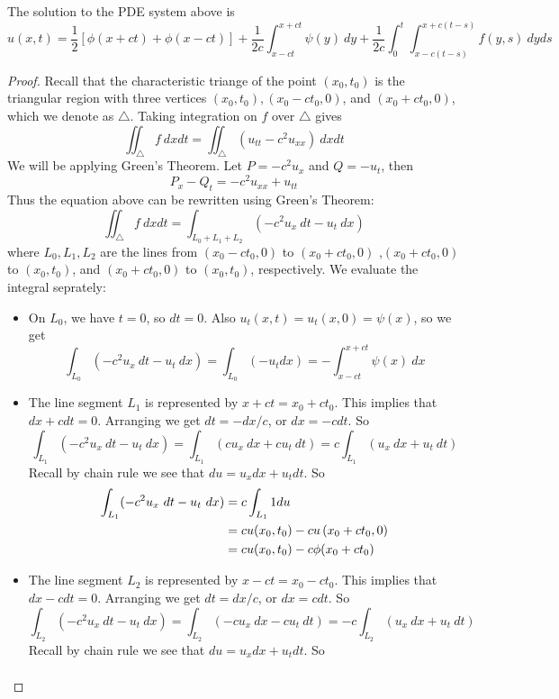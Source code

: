 \begin{thm}
    The solution to the PDE system above is 
    \[u(x,t) = \frac{1}{2}[\phi(x+ct) + \phi(x-ct)] + \frac{1}{2c}\int_{x-ct}^{x+ct}\psi(y)\ dy + \frac{1}{2c}\int_{0}^{t}\int^{x+c(t-s)}_{x-c(t-s)} f(y,s)\ dyds\]
\end{thm}
\begin{proof}
    Recall that the characteristic triange of the point $(x_0,t_0)$ is the triangular region with three vertices $(x_0,t_0), (x_0-ct_0,0)$, and $(x_0+ct_0,0)$, which we denote as $\triangle$. Taking integration on $f$ over $\triangle$ gives
    \[\iint_{\triangle}f\ dxdt = \iint_{\triangle}(u_{tt} -c^2 u_{xx})\ dxdt\]
    We will be applying Green's Theorem. Let $P = -c^2 u_x$ and $Q = -u_t$, then 
    \[P_x - Q_t = -c^2 u_{xx} + u_{tt}\]
    Thus the equation above can be rewritten using Green's Theorem:
    \[\iint_{\triangle}f\ dxdt = \int_{L_0 + L_1 + L_2} (-c^2 u_x\ dt - u_t\ dx)\]
    where $L_0,L_1, L_2$ are the lines from $(x_0-ct_0,0)$ to $(x_0+ct_0, 0)$ ,$(x_0+ct_0,0)$ to $(x_0,t_0)$, and $(x_0+ct_0,0)$ to $(x_0,t_0)$, respectively. We evaluate the integral seprately:
    \begin{itemize}
        \item On $L_0$, we have $t=0$, so $dt = 0$. Also $u_t(x,t) = u_t(x,0) = \psi(x)$, so we get \[\int_{L_0} (-c^2 u_x\ dt - u_t\ dx) = \int_{L_0} (-u_t dx) = -\int_{x - ct}^{x + ct}\psi(x)\ dx\]
        \item The line segment $L_1$ is represented by $x+ct = x_0 + ct_0$. This implies that $dx + cdt = 0$. Arranging we get $dt = -dx/c$, or $dx = -cdt$. So \[\int_{L_1} (-c^2 u_x\ dt - u_t\ dx) = \int_{L_1} (c u_x\ dx + cu_t\ dt) = c\int_{L_1}(u_x\ dx + u_t\ dt)\]
        Recall by chain rule we see that $du = u_xdx + u_t dt$. So 
        \begin{align*}
            \int_{L_1} (-c^2 u_x\ dt - u_t\ dx) &= c\int_{L_1} 1 du \\
            &= cu(x_0, t_0) -cu\left(x_0 + ct_0, 0\right)\\ 
            &= cu(x_0, t_0) -c\phi(x_0 + ct_0)
        \end{align*}
        \item The line segment $L_2$ is represented by $x-ct = x_0 - ct_0$. This implies that $dx - cdt = 0$. Arranging we get $dt = dx/c$, or $dx = cdt$. So \[\int_{L_2} (-c^2 u_x\ dt - u_t\ dx) = \int_{L_2} (-c u_x\ dx - cu_t\ dt) = -c\int_{L_2}(u_x\ dx + u_t\ dt)\]
        Recall by chain rule we see that $du = u_xdx + u_t dt$. So 
        \begin{align*}

\end{align*}
\end{itemize}
\end{proof}
